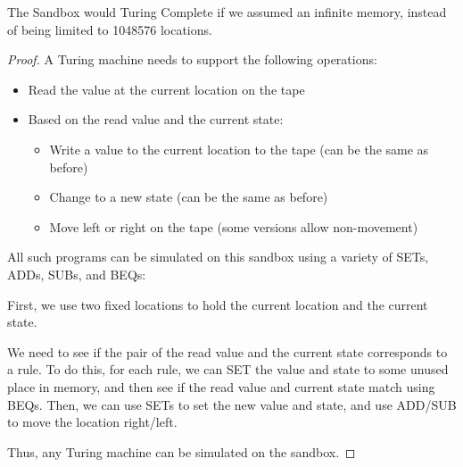 \documentclass{article}
\begin{document}
The Sandbox would Turing Complete if we assumed an infinite memory, instead of being limited to 1048576 locations.

\begin{proof}
	A Turing machine needs to support the following operations:
	\begin{itemize}
	\item Read the value at the current location on the tape
	\item Based on the read value and the current state:
		\begin{itemize}
			\item Write a value to the current location to the tape (can be the same as before)
			\item Change to a new state (can be the same as before)
			\item Move left or right on the tape (some versions allow non-movement)
		\end{itemize}
	\end{itemize}
	All such programs can be simulated on this sandbox using a variety of SETs, ADDs, SUBs, and BEQs:
	
	First, we use two fixed locations to hold the current location and the current state.
	
	We need to see if the pair of the read value and the current state corresponds to a rule. To do this, for each rule, we can SET the value and state to some unused place in memory, and then see if the read value and current state match using BEQs. Then, we can use SETs to set the new value and state, and use ADD/SUB to move the location right/left.
	
	Thus, any Turing machine can be simulated on the sandbox.
\end{proof}
\end{document}
